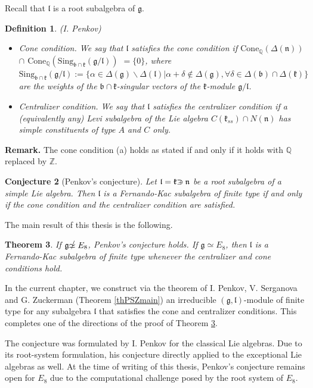 \documentclass[12pt]{report}
\newtheorem{theo}{Theorem}[section]
\newtheorem{conjecture}[theo]{Conjecture}
\newtheorem{defi}[theo]{Definition}
\newcommand {\ZZ} {\mathbb {Z}}
\newcommand {\QQ} {\mathbb {Q}}
\newcommand{\kk}{\mathfrak{k}}
\newcommand{\nn}{\mathfrak{n}}
\newcommand{\gG}{\mathfrak{g}}
\newcommand{\bb}{\mathfrak{b}}
\newcommand{\lL}{\mathfrak{l}}
\newcommand{\Cone}{\mathrm{Cone}}
\newcommand{\hw}{\mathrm{Sing}}
\def\crplus{\hbox{$\supset${\raise1.05pt\hbox{\kern -0.60em ${\scriptscriptstyle +}$}}\ }}
\def\nsimeq{\hbox{$\simeq${\raise1.05pt\hbox{\kern -0.55em $/$}}\ }}
\begin{document}
Recall that $\lL$ is a root subalgebra of $\gG$.
\begin{defi}\label{defCone}
(I. Penkov) 
\begin{itemize}
\item[(a)] \emph{Cone condition}. We say that $\lL$ satisfies the cone condition if $\Cone_{\QQ}(\Delta(\nn))$ $\cap$ $ \Cone_{\QQ}( \hw_{ \bb \cap \kk} (\gG/\lL))$ $=\{0\}$, where $\hw_{\bb\cap\kk}(\gG/\lL):= \{\alpha \in \Delta (\gG)\backslash\Delta(\lL) | \alpha + \delta \notin \Delta(\gG), \forall \delta \in\Delta(\bb)\cap\Delta(\kk)\}$ are the weights of the $\bb\cap\kk$-singular vectors of the $\kk$-module $\gG/\lL$.
\item[(b)] \emph{Centralizer condition}. We say that $\lL$ satisfies the centralizer condition if a (equivalently any) Levi subalgebra of the Lie algebra $C(\kk_{ss})\cap N(\nn)$ has simple constituents of type $A$ and $C$ only.
\end{itemize}
\end{defi}
\textbf{Remark.} The cone condition (a) holds as stated if and only if it holds with $\QQ$ replaced by $\ZZ$. %

\begin{conjecture}[Penkov's  conjecture]\label{conjPenkov}
Let $\lL=\kk\crplus\nn$ be a root subalgebra  of a simple Lie algebra. Then $\lL$ is a Fernando-Kac subalgebra of finite type if and only if the cone condition and the centralizer condition are satisfied.
\end{conjecture}
The main result of this thesis is the following.
\begin{theo}\label{thMainResult}
If $\gG\nsimeq E_8$, Penkov's conjecture holds. If $\gG\simeq E_8$, then $\lL$ is a Fernando-Kac subalgebra of finite type whenever the centralizer and cone conditions hold.
\end{theo}
In the current chapter, we construct via the theorem of I. Penkov, V. Serganova and G. Zuckerman (Theorem \ref{thPSZmain}) an irreducible $(\gG,\lL)$-module of finite type for any subalgebra $\lL$ that satisfies the cone and centralizer conditions. This completes one of the directions of the proof of Theorem \ref{thMainResult}.

The conjecture was formulated by I. Penkov for the classical Lie algebras. Due to its root-system formulation, his conjecture directly applied to the exceptional Lie algebras as well. At the time of writing of this thesis, Penkov's conjecture remains open for $E_8$ due to the computational challenge posed by the root system of $E_8$. 
\end{document}
